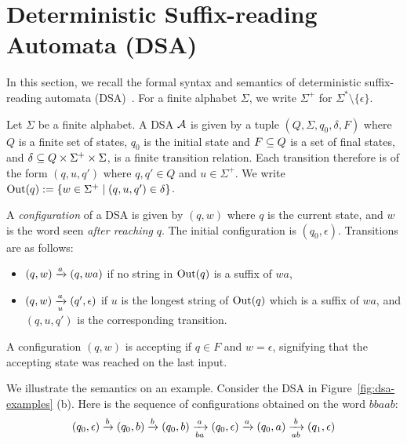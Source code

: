 \newcommand{\lt}{\ell}
\newcommand{\rt}{r}

\section{Deterministic Suffix-reading Automata (DSA)}
\label{sec:prelims}

In this section, we recall the formal syntax and semantics of deterministic suffix-reading automata (DSA)~\cite{DBLP:journals/corr/abs-2410-22761}. For a finite alphabet $\Sigma$, we write $\Sigma^+$ for $\Sigma^* \setminus \{\epsilon\}$. 

\begin{definition}
Let $\Sigma$ be a finite alphabet. A DSA $\mathcal{A}$ is given by a tuple $(Q, \Sigma, q_0, \delta, F)$ where $Q$ is a finite set of states, $q_0$ is the initial state and $F \subseteq Q$ is a set of final states, and $\delta \subseteq Q \times \Sigma^+ \times \Sigma$, is a finite transition relation. Each transition therefore is of the form $(q, u, q')$ where $q, q' \in Q$ and $u \in \Sigma^+$. We write $\operatorname{Out}(q) := \{ w \in \Sigma^+ \mid (q, u, q') \in \delta \}$. 
\end{definition}

A \emph{configuration} of a DSA is given by $(q, w)$ where $q$ is the current state, and $w$ is the word seen \emph{after reaching} $q$. The initial configuration is $(q_0, \epsilon)$. Transitions are as follows:
\begin{itemize}
\item $(q, w) \xrightarrow{a} (q, wa)$ if no string in $\operatorname{Out}(q)$ is a suffix of $wa$,
\item $(q, w) \xrightarrow[u]{a} (q', \epsilon)$ if $u$ is the longest string of $\operatorname{Out}(q)$ which is a suffix of $wa$, and $(q, u, q')$ is the corresponding transition. 
\end{itemize}
A configuration $(q, w)$ is accepting if $q \in F$ and $w = \epsilon$, signifying that the accepting state was reached on the last input.


We illustrate the semantics on an example. Consider the DSA in Figure~\ref{fig:dsa-examples} (b). Here is the sequence of configurations obtained on the word $bbaab$:
\begin{align*}
(q_0, \epsilon) \xrightarrow{b} (q_0, b) \xrightarrow{b} (q_0, b) \xrightarrow[ba]{a} (q_0, \epsilon) \xrightarrow{a} (q_0, a) \xrightarrow[ab]{b} (q_1, \epsilon)
\end{align*}

